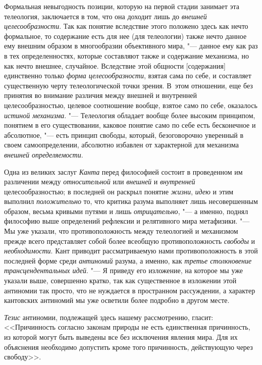{{Формальная невыгодность позиции, которую на первой стадии
занимает эта телеология, заключается в том, что она доходит лишь до
{\em внешней целесообразности}.
Так как понятие вследствие этого положено здесь как нечто
формальное, то содержание есть для нее (для телеологии) также нечто данное
ему внешним образом в многообразии объективного мира, "---
данное ему как раз в тех определенностях, которые составляют
также и содержание механизма, но как нечто внешнее, случайное. Вследствие
этой общности [содержания] единственно только
{\em форма целесообразности},
взятая сама по себе, и составляет существенную черту
телеологической точки зрения. В~этом отношении, еще без принятия во
внимание различия между внешней и внутренней целесообразностью, целевое
соотношение вообще, взятое само по себе, оказалось
{\em истиной механизма}. "---
Телеология обладает вообще более высоким принципом, понятием
в его существовании, каковое понятие само по себе есть бесконечное и
абсолютное, "--- есть принцип свободы, который, безоговорочно
уверенный в своем самоопределении, абсолютно избавлен от характерной для
механизма {\em внешней определяемости}.

Одна из великих заслуг
{\em Канта} перед
философией состоит в проведенном им различении между
{\em относительной} или
{\em внешней} и
{\em внутренней}
целесообразностью; в последней он раскрыл понятие
{\em жизни},
{\em идею} и этим выполнил
{\em положительно} то,
что критика разума выполняет лишь несовершенным образом, весьма кривыми
путями и лишь {\em отрицательно}, "---
а именно, поднял философию выше определений рефлексии и
релятивного мира метафизики. "--- Мы уже указали, что
противоположность между телеологией и механизмом прежде всего представляет
собой более всеобщую противоположность
{\em свободы} и
{\em необходимости}. Кант
приводит рассматриваемую нами противоположность в этой последней форме
среди {\em антиномий}
разума, а именно, как
{\em третье столкновение
трансцендентальных идей}. "--- Я приведу его изложение, на
которое мы уже указали выше, совершенно кратко, так как существенное в
изложении этой антиномии так просто, что не нуждается в пространном
рассуждении, а характер кантовских антиномий мы уже осветили
более подробно в другом месте.

{\em Тезис} антиномии,
подлежащей здесь нашему рассмотрению, гласит: <<Причинность согласно законам
природы не есть единственная причинность, из которой могут быть выведены
все без исключения явления мира. Для их объяснения необходимо допустить
кроме того причинность, действующую через свободу>>.

}}
